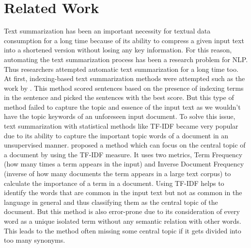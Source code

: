 \documentclass[acmlarge]{acmart}
\begin{document}
\section{Related Work}\label{sec:literature-review}
Text summarization has been an important necessity for textual data consumption for a long time because of its ability to compress a given input text into a shortened version without losing any key information. For this reason, automating the text summarization process has been a research problem for NLP. Thus researchers attempted automatic text summarization for a long time too. At first, indexing-based text summarization methods were attempted such as the work by \citeauthor{Baxendale_1958_firstsummarization} \cite{Baxendale_1958_firstsummarization}. This method scored sentences based on the presence of indexing terms in the sentence and picked the sentences with the best score. But this type of method failed to capture the topic and essence of the input text as we wouldn't have the topic keywords of an unforeseen input document. To solve this issue, text summarization with statistical methods like TF-IDF became very popular due to its ability to capture the important topic words of a document in an unsupervised manner. \citeauthor{edmundson_1969_earlysum} \cite{edmundson_1969_earlysum} proposed a method which can focus on the central topic of a document by using the TF-IDF measure. It uses two metrics, Term Frequency (how many times a term appears in the input) and Inverse Document Frequency (inverse of how many documents the term appears in a large text corpus) to calculate the importance of a term in a document. Using TF-IDF helps to identify the words that are common in the input text but not as common in the language in general and thus classifying them as the central topic of the document. But this method is also error-prone due to its consideration of every word as a unique isolated term without any semantic relation with other words. This leads to the method often missing some central topic if it gets divided into too many synonyms.
\end{document}
